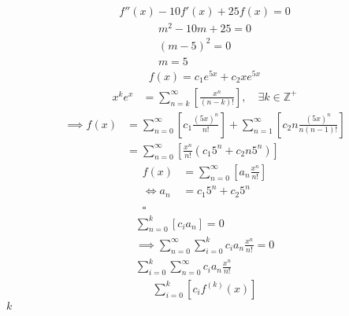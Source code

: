 \documentclass{article}
\begin{document}
\begin{align}
    f''{\left({ x }\right)}- 10f'{\left({ x }\right)}+  25f{\left({ x }\right)}= 0 \label{eq:rep-roots-func-ode}
\end{align}
\begin{align}
    m^2- 10m+  25 = 0 \nonumber \\
    {\left({ m- 5 }\right)}^2 = 0 \nonumber \\
    m= 5 \label{eq:rep-roots-recurrence-char-sol}
\end{align}
\begin{align}
    f{\left({ x }\right)}= c_1e^{5x} +  c_2 x e^{5x} \label{eq:rep-roots-ode-sol}
\end{align}
\begin{align}
    x^ke^x &= \sum^{\infty}_{n= k}   {\left[{ \frac{x^n}{{\left({ n- k }\right)}!} }\right]}, \quad \exists k \in \mathbb{Z}^+ \label{eq:uniq-roots-pow-series-ident}
\end{align}
\begin{align}
    \implies  f{\left({ x }\right)} &= \sum^{\infty}_{n= 0}   {\left[{ c_1 \frac{{\left({ 5x }\right)}^n}{n!} }\right]}  +  \sum^{\infty}_{n= 1}   {\left[{ c_2 n \frac{{\left({ 5x }\right)^n}}{n{\left({ n-1 }\right)}!} }\right]} \nonumber \\
 &= \sum^{\infty}_{n= 0}   {\left[{ \frac{x^n}{n!} {\left({ c_{1}5^n +  c_2 n 5^n   }\right)} }\right]} \nonumber
\end{align}
\begin{align}
    f{\left({ x }\right)}&=     \sum^{\infty}_{n= 0}   {\left[{ a_n \frac{x^n}{n!} }\right]} \nonumber \\
    \iff a_n &= c_{1}5^n +  c_{2}5^n \nonumber \\ \nonumber
    \ \nonumber \\
    \square \nonumber
\end{align}
\begin{align}
     \sum^{k}_{n= 0}   {\left[{ c_i a_n }\right]}  = 0 \nonumber \\
      \implies  \sum^{\infty}_{n= 0}   \sum^{k}_{i= 0}   c_i a_n \frac{x^n}{n!} = 0 \nonumber \\
      \sum^{k}_{i= 0}   \sum^{\infty}_{n= 0}   c_i a_n \frac{x^n}{n!} \nonumber
\end{align}
\begin{align}
    \sum^{k}_{i= 0}   {\left[{ c_if^{{\left({ k }\right)}}  {\left({ x }\right)}    }\right]} \label{eq:gen-form-rep-roots-ode}
\end{align}
$k$
\end{document}
